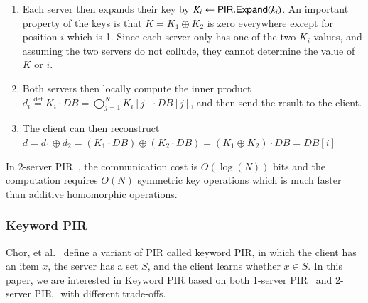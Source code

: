 {\begin{enumerate}
		\item Each server then expands their key by $K_i \gets \textsf{PIR.Expand}(k_i)$. An important property of the keys is that $K = K_1 \oplus K_2$ is zero everywhere except for position $i$ which is 1. Since each server only has one of the two $K_i$ values, and assuming the two servers do not collude, they cannot determine the value of $K$ or $i$.
		
		\item Both servers then locally compute the inner product $d_i \overset{\textrm{def}}= K_i \cdot DB = \textstyle\bigoplus_{j=1}^N K_i[j] \cdot DB[j]$, and then send the result to the client.
		
		\item The client can then reconstruct $d = d_1 \oplus d_2 = (K_1 \cdot DB) \oplus (K_2 \cdot DB) = (K_1 \oplus K_2) \cdot DB = DB[i]$
		
	\end{enumerate}
	
	In 2-server PIR~\cite{EC:BoyGilIsh15,CCS:BoyGilIsh16}, the communication cost is $O(\log(N))$ bits and the computation requires $O(N)$ symmetric key operations which is much faster than additive homomorphic operations.
	
	\subsubsection{Keyword PIR}
	}
	Chor, et al.~\cite{EPRINT:ChoGilNao98} define a variant of PIR called keyword PIR, in which the client has an item $x$, the server has a set $S$, and the client learns whether $x \in S$.   In this paper, we are interested in Keyword PIR based on both 1-server PIR~\cite{SP:ACLS18,  EPRINT:ALPRSSY19} and 2-server PIR~\cite{EC:BoyGilIsh15,CCS:BoyGilIsh16} with different trade-offs.
	
